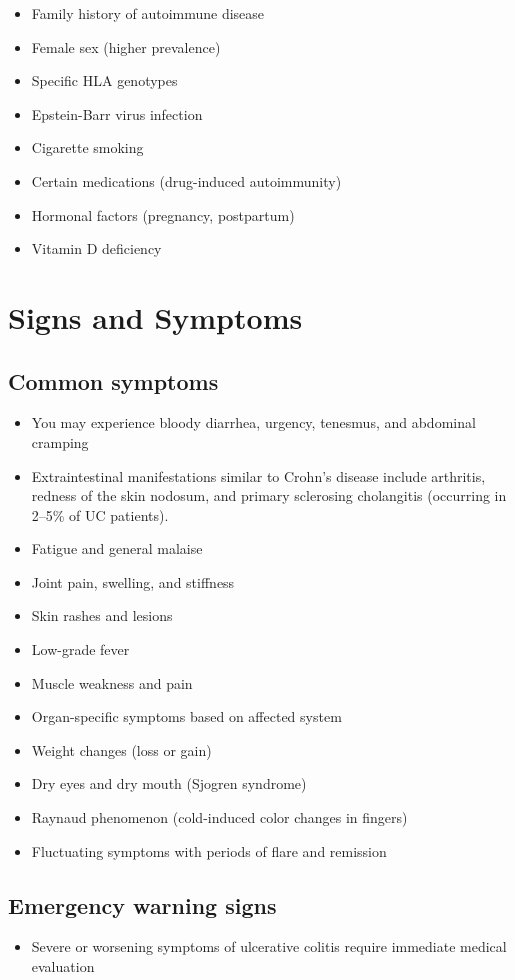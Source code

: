 \begin{itemize}[noitemsep]
  \item Family history of autoimmune disease
  \item Female sex (higher prevalence)
  \item Specific HLA genotypes
  \item Epstein-Barr virus infection
  \item Cigarette smoking
  \item Certain medications (drug-induced autoimmunity)
  \item Hormonal factors (pregnancy, postpartum)
  \item Vitamin D deficiency
\end{itemize}
\section{Signs and Symptoms}

\subsection{Common symptoms}
\begin{itemize}[noitemsep]
  \item You may experience bloody diarrhea, urgency, tenesmus, and abdominal cramping
  \item Extraintestinal manifestations similar to Crohn's disease include arthritis, redness of the skin nodosum, and primary sclerosing cholangitis (occurring in 2--5\% of UC patients).
  \item Fatigue and general malaise
  \item Joint pain, swelling, and stiffness
  \item Skin rashes and lesions
  \item Low-grade fever
  \item Muscle weakness and pain
  \item Organ-specific symptoms based on affected system
  \item Weight changes (loss or gain)
  \item Dry eyes and dry mouth (Sjogren syndrome)
  \item Raynaud phenomenon (cold-induced color changes in fingers)
  \item Fluctuating symptoms with periods of flare and remission
\end{itemize}

\subsection{Emergency warning signs}
\begin{itemize}[noitemsep]
  \item Severe or worsening symptoms of ulcerative colitis require immediate medical evaluation
\end{itemize}
